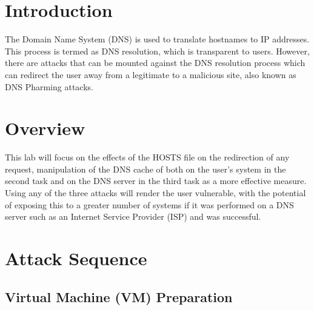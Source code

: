 \documentclass[a4paper,12pt]{article}
\begin{document}
	\newpage
	\setcounter{section}{0}
	\section{Introduction}
	The Domain Name System (DNS) is used to translate hostnames to IP addresses. This process is termed as DNS resolution, which is transparent to users. However, there are attacks that can be mounted against the DNS resolution process which can redirect the user away from a legitimate to a malicious site, also known as DNS Pharming attacks.
\section{Overview}
This lab will focus on the effects of the HOSTS file on the redirection of any request, manipulation of the DNS cache of both on the user's system in the second task and on the DNS server in the third task as a more effective measure. Using any of the three attacks will render the user vulnerable, with the potential of exposing this to a greater number of systems if it was performed on a DNS server such as an Internet Service Provider (ISP) and was successful.
\newpage
\section{Attack Sequence}
\subsection{Virtual Machine (VM) Preparation}
\end{document}
